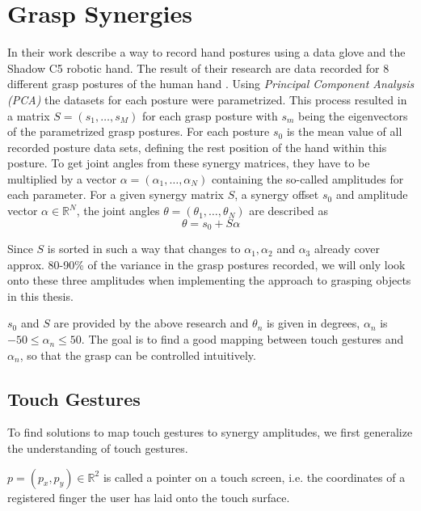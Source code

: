\section{Grasp Synergies}
\label{sec:conc:synergy}
In their work \citeauthor{Bernardino2013} describe a way to record hand postures using a data glove and the Shadow C5 robotic hand. The result of their research are data recorded for 8 different grasp postures of the human hand \cite{Bernardino2013}. Using \textit{Principal Component Analysis (PCA)} the datasets for each posture were parametrized. This process resulted in a matrix $S = (s_1, \dots , s_M)$ for each grasp posture with $s_m$ being the eigenvectors of the parametrized grasp postures. For each posture $s_0$ is the mean value of all recorded posture data sets, defining the rest position of the hand within this posture. To get joint angles from these synergy matrices, they have to be multiplied by a vector $\alpha = (\alpha_1, \dots , \alpha_N)$ containing the so-called amplitudes for each parameter. For a given synergy matrix $S$, a synergy offset $s_0$ and amplitude vector $\alpha \in \mathbb{R}^N$, the joint angles $\theta = (\theta_1, \dots , \theta_N)$ are described as
\begin{equation}
\label{eq:syn}
\theta = s_0 + S\alpha
\end{equation}

Since $S$ is sorted in such a way that changes to $\alpha_1, \alpha_2$ and $\alpha_3$ already cover approx. 80-90\% of the variance in the grasp postures recorded\cite{Bernardino2013}, we will only look onto these three amplitudes when implementing the approach to grasping objects in this thesis.

$s_0$ and $S$ are provided by the above research and $\theta_n$ is given in degrees, $\alpha_n$ is $-50 \leq \alpha_n \leq 50$. The goal is to find a good mapping between touch gestures and $\alpha_n$, so that the grasp can be controlled intuitively.

\subsection{Touch Gestures}
\label{sec:conc:gestures}
To find solutions to map touch gestures to synergy amplitudes, we first generalize the understanding of touch gestures.

\begin{defn}
$p = (p_x, p_y) \in \mathbb{R}^2$ is called a pointer on a touch screen, i.e. the coordinates of a registered finger the user has laid onto the touch surface.
\end{defn}

